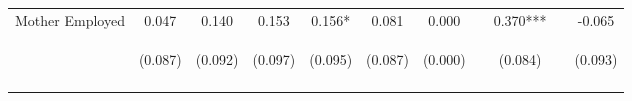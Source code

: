 \begin{tabular}{lcccccccccc}
\noalign{\smallskip}Mother Employed & 0.047 & 0.140 & 0.153 & 0.156* & 0.081 & 0.000 &  & 0.370*** &  & -0.065\\
 & \begin{footnotesize}(0.087)\end{footnotesize} & \begin{footnotesize}(0.092)\end{footnotesize} & \begin{footnotesize}(0.097)\end{footnotesize} & \begin{footnotesize}(0.095)\end{footnotesize} & \begin{footnotesize}(0.087)\end{footnotesize} & \begin{footnotesize}(0.000)\end{footnotesize} & \begin{footnotesize}\end{footnotesize} & \begin{footnotesize}(0.084)\end{footnotesize} & \begin{footnotesize}\end{footnotesize} & \begin{footnotesize}(0.093)\end{footnotesize}\\
\noalign{\smallskip}\hline\end{tabular}\\
